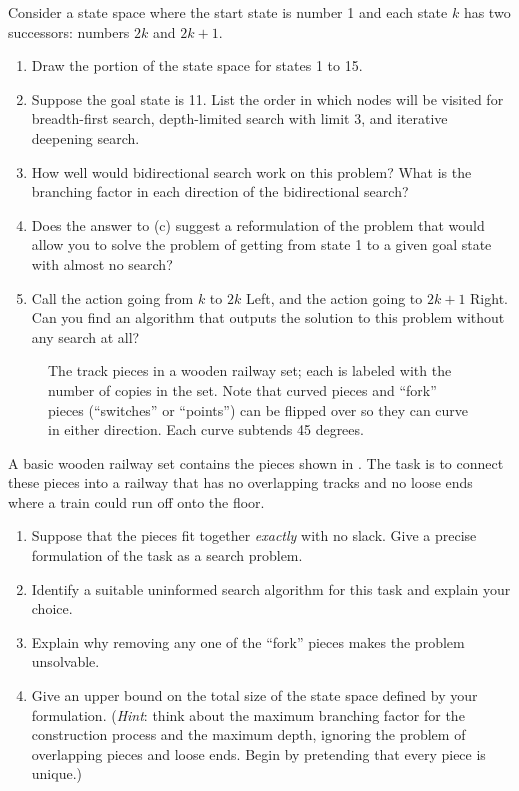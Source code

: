 \begin{uexercise}%
Consider a state space where the start state is number 1 and each
state \(k\) has two successors: numbers \(2k\) and \(2k+1\). 
\begin{enumerate}
\item Draw the portion of the state space for states 1 to 15.
\item Suppose the goal state is 11. List the order in which nodes will
  be visited for breadth-first search, depth-limited search with limit
  3, and iterative deepening search. 
\item How well would bidirectional search work on this problem? What
  is the branching factor in each direction of the bidirectional
  search? 
\item Does the answer to (c) suggest a reformulation of the problem
  that would allow you to solve the problem of getting from state 1 to
  a given goal state with almost no search? 
\item Call the action going from \(k\) to \(2k\) Left, and the action
  going to \(2k+1\) Right.  Can you find an algorithm that outputs the
  solution to this problem without any search at all? 
\end{enumerate}
\end{uexercise} 

\begin{figure}[tbp]
{}
\caption{The track pieces in a wooden railway set; each is labeled
with the number of copies in the set. Note that curved pieces and
``fork'' pieces (``switches'' or ``points'') can be flipped over so
they can curve in either direction. Each curve subtends 45 degrees.}
\label{brio-figure}
\end{figure} 

\begin{exercise}%
A basic wooden railway set contains the pieces shown in .
The task is to connect these pieces into a railway that has no
overlapping tracks and no loose ends where a train
could run off onto the floor.
\begin{enumerate}
\item Suppose that the pieces fit together {\em exactly} with no slack.
Give a precise formulation of the task as a search problem.
\item Identify a suitable uninformed search algorithm for this task and
explain your choice. 
\item Explain why removing any one of the ``fork'' pieces makes the problem unsolvable.
\item Give an upper bound on the total size of the state space defined by your formulation.
({\em Hint}: think about the maximum branching factor for the construction process and the maximum depth, ignoring the
problem of overlapping pieces and loose ends. Begin by pretending that every piece is unique.)
\end{enumerate}
\end{exercise} 

